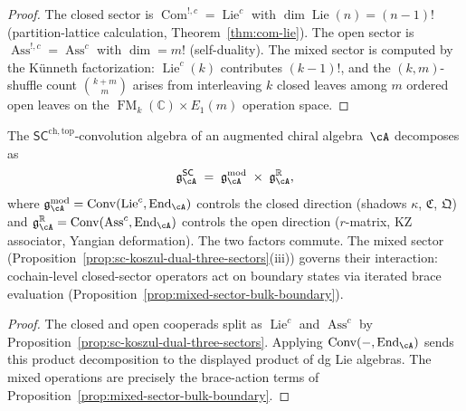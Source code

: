 \begin{proof}
The closed sector is $\operatorname{Com}^{!,c} =
\operatorname{Lie}^c$ with $\dim\operatorname{Lie}(n) = (n{-}1)!$
(partition-lattice calculation,
Theorem~\ref{thm:com-lie}).
The open sector is $\operatorname{Ass}^{!,c} =
\operatorname{Ass}^c$ with $\dim = m!$ (self-duality).
The mixed sector is computed by the K\"unneth
factorization: $\operatorname{Lie}^c(k)$ contributes
$(k{-}1)!$, and the $(k,m)$-shuffle count
$\binom{k+m}{m}$ arises from interleaving $k$ closed
leaves among $m$ ordered open leaves on the
$\operatorname{FM}_k(\mathbb{C}) \times E_1(m)$
operation space.
\end{proof}

\begin{corollary}
\label{cor:convolution-factorization}
\ClaimStatusProvedHere
{}
The $\mathsf{SC}^{\mathrm{ch,top}}$-convolution algebra
of an augmented chiral algebra~$\cA$ decomposes as
\[
\mathfrak{g}_\cA^{\mathsf{SC}}
\;=\;
\mathfrak{g}_\cA^{\mathrm{mod}}
\;\times\;
\mathfrak{g}_\cA^{\mathbb{R}},
\]
where
$\mathfrak{g}_\cA^{\mathrm{mod}}
= \operatorname{Conv}(\operatorname{Lie}^c, \operatorname{End}_\cA)$
controls the closed direction
(shadows $\kappa$, $\mathfrak{C}$, $\mathfrak{Q}$)
and
$\mathfrak{g}_\cA^{\mathbb{R}}
= \operatorname{Conv}(\operatorname{Ass}^c, \operatorname{End}_\cA)$
controls the open direction
($r$-matrix, KZ associator, Yangian deformation).
The two factors commute. The mixed sector
\textup{(}Proposition~\textup{\ref{prop:sc-koszul-dual-three-sectors}(iii)}\textup{)}
governs their interaction: cochain-level closed-sector operators act on
boundary states via iterated brace evaluation
\textup{(}Proposition~\textup{\ref{prop:mixed-sector-bulk-boundary}}\textup{)}.
\end{corollary}

\begin{proof}
The closed and open cooperads split as
$\operatorname{Lie}^c$ and $\operatorname{Ass}^c$ by
Proposition~\ref{prop:sc-koszul-dual-three-sectors}. Applying
$\operatorname{Conv}(-,\operatorname{End}_\cA)$ sends this product
decomposition to the displayed product of dg Lie algebras. The mixed
operations are precisely the brace-action terms of
Proposition~\ref{prop:mixed-sector-bulk-boundary}.
\end{proof}

